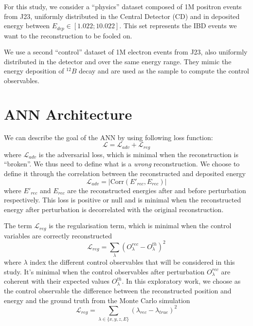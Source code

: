 \documentclass[../main.tex]{subfiles}
\begin{document}
For this study, we consider a ``physics'' dataset composed of 1M positron events from J23, uniformly distributed in the Central Detector (CD) and in deposited energy between $E_{dep} \in [1.022; 10.022]$. This set represents the IBD events we want to the reconstruction to be fooled on.

We use a second “control” dataset of 1M electron events from J23, also uniformly distributed in the detector and over the same energy range. They mimic the energy deposition of $^{12}B$ decay and are used as the sample to compute the control observables.



\section{ANN Architecture}
\label{sec:janne:arch}
We can describe the goal of the ANN by using following loss function:
\begin{equation}
  \label{eq:janne:loss}
  \mathcal{L} = \mathcal{L}_{adv} + \mathcal{L}_{reg}
\end{equation}
where $\mathcal{L}_{adv}$ is the adversarial loss, which is minimal when the reconstruction is ``broken''. We thus need to define what is a \textit{wrong} reconstruction. We choose to define it through the correlation between the reconstructed and deposited energy
\begin{equation}
  \label{eq:janne:ladv}
  \mathcal{L}_{adv} = |\mathrm{Corr}(E'_{rec}, E_{rec})|
\end{equation}
where $E'_{rec}$ and $E_{rec}$ are the reconstructed energies after and before perturbation respectively.
This loss is positive or null and is minimal when the reconstructed energy after perturbation is decorrelated with the original reconstruction.

The term $\mathcal{L}_{reg}$ is the regularisation term, which is minimal when the control variables are correctly reconstructed
\begin{equation}
  \mathcal{L}_{reg} = \sum_\lambda (O^{rec}_\lambda - O^{th}_\lambda)^2
\end{equation}
where $\lambda$ index the different control observables that will be considered in this study. It's minimal when the control observables after perturbation $O^{rec}_\lambda$ are coherent with their expected values $O^{th}_\lambda$.
In this exploratory work, we choose as the control observable the difference between the reconstructed position and energy and the ground truth from the Monte Carlo simulation
\begin{equation}
  \label{eq:janne:lreg}
  \mathcal{L}_{reg} = \sum_{\lambda \in \{x, y, z, E\}} (\lambda_{rec} - \lambda_{true})^2
\end{equation}
\end{document}
